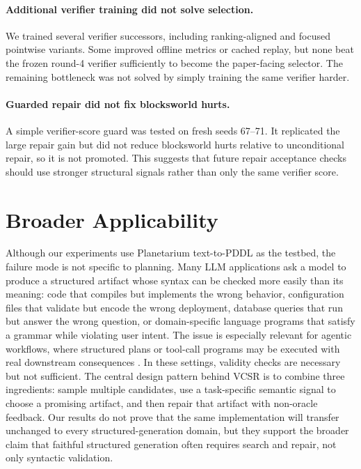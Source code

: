 \documentclass[11pt]{article}
\newcommand{\vcsr}{\textsc{VCSR}\xspace}
\newcommand{\pddl}{\textsc{PDDL}\xspace}
\begin{document}
\paragraph{Additional verifier training did not solve selection.}
We trained several verifier successors, including ranking-aligned and focused
pointwise variants. Some improved offline metrics or cached replay, but none
beat the frozen round-4 verifier sufficiently to become the paper-facing
selector. The remaining bottleneck was not solved by simply training the same
verifier harder.

\paragraph{Guarded repair did not fix blocksworld hurts.}
A simple verifier-score guard was tested on fresh seeds 67--71. It replicated
the large repair gain but did not reduce blocksworld hurts relative to
unconditional repair, so it is not promoted. This suggests that future repair
acceptance checks should use stronger structural signals rather than only the
same verifier score.

\section{Broader Applicability}

Although our experiments use Planetarium text-to-\pddl as the testbed, the
failure mode is not specific to planning. Many LLM applications ask a model to
produce a structured artifact whose syntax can be checked more easily than its
meaning: code that compiles but implements the wrong behavior, configuration
files that validate but encode the wrong deployment, database queries that run
but answer the wrong question, or domain-specific language programs that satisfy
a grammar while violating user intent. The issue is especially relevant for
agentic workflows, where structured plans or tool-call programs may be executed
with real downstream consequences \citep{yao2023react,schick2023toolformer}.
In these settings, validity checks are necessary but not sufficient. The central
design pattern behind \vcsr is to combine three ingredients: sample multiple
candidates, use a task-specific semantic signal to choose a promising artifact,
and then repair that artifact with non-oracle feedback. Our results do not
prove that the same implementation will transfer unchanged to every
structured-generation domain, but they support the broader claim that faithful
structured generation often requires search and repair, not only syntactic
validation.
\end{document}
